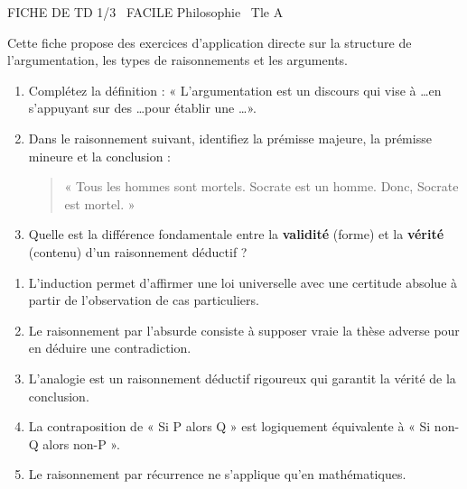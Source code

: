 \documentclass[11pt]{article}
\begin{document}
\begin{tcolorbox}[enhanced,colback=popink,colframe=popink,arc=10pt,boxrule=0pt,left=12pt,right=12pt,top=9pt,bottom=9pt]
{\color{white}\popxbold\small FICHE DE TD 1/3 \textbullet\ FACILE \hfill Philosophie \textbullet\ Tle A\par}
\end{tcolorbox}
\vspace{4pt}
Cette fiche propose des exercices d'application directe sur la structure de l'argumentation, les types de raisonnements et les arguments.

\begin{exercice}
\begin{enumerate}
    \item Complétez la définition : « L'argumentation est un discours qui vise à \ldots \space en s'appuyant sur des \ldots \space pour établir une \ldots ». 
    \item Dans le raisonnement suivant, identifiez la prémisse majeure, la prémisse mineure et la conclusion : 
    \begin{quote}
    « Tous les hommes sont mortels. Socrate est un homme. Donc, Socrate est mortel. »
    \end{quote}
    \item Quelle est la différence fondamentale entre la \textbf{validité} (forme) et la \textbf{vérité} (contenu) d'un raisonnement déductif ?
\end{enumerate}
\end{exercice}

\begin{exercice}
\begin{enumerate}
    \item L'induction permet d'affirmer une loi universelle avec une certitude absolue à partir de l'observation de cas particuliers.
    \item Le raisonnement par l'absurde consiste à supposer vraie la thèse adverse pour en déduire une contradiction.
    \item L'analogie est un raisonnement déductif rigoureux qui garantit la vérité de la conclusion.
    \item La contraposition de « Si P alors Q » est logiquement équivalente à « Si non-Q alors non-P ».
    \item Le raisonnement par récurrence ne s'applique qu'en mathématiques.
\end{enumerate}
\end{exercice}
\end{document}
